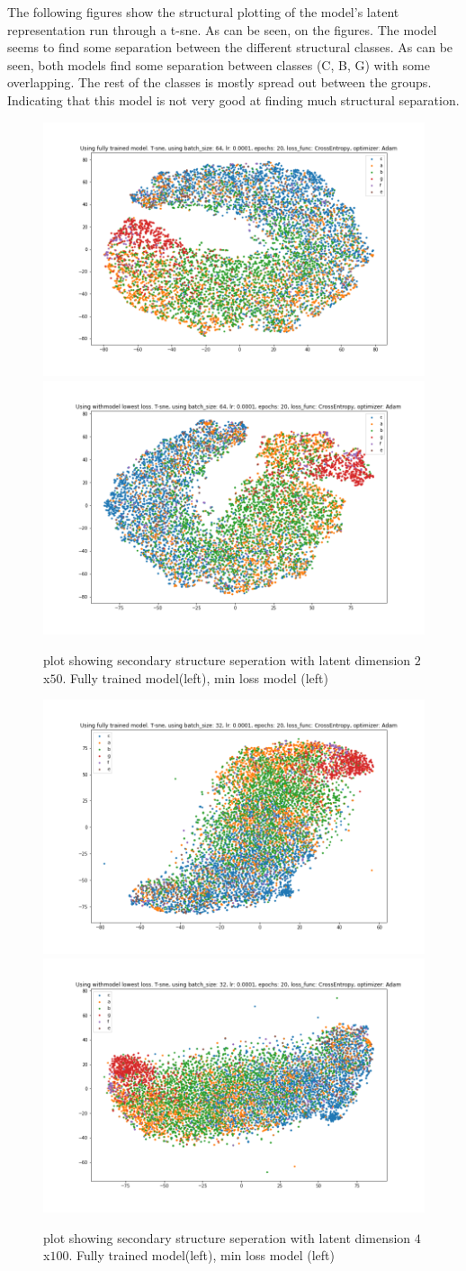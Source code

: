 \noindent
The following figures show the structural plotting of the model's latent representation run through a t-sne. As can be seen, on the figures. The model seems to find some separation between the different structural classes. As can be seen, both models find some separation between classes (C, B, G) with some overlapping. The rest of the classes is mostly spread out between the groups. Indicating that this model is not very good at finding much structural separation. \\

\begin{figure}[!ht]
  \centering
  \includegraphics[width=0.4\linewidth]{latex/imgs/last_50.png}
  \includegraphics[width=0.4\linewidth]{latex/imgs/best_50.png}
  \caption{plot showing secondary structure seperation with latent dimension $2$x$50$. Fully trained model(left), min loss model (left)}
\end{figure}

\begin{figure}[!ht]
  \centering
  \includegraphics[width=0.4\linewidth]{latex/imgs/last_100.png}
  \includegraphics[width=0.4\linewidth]{latex/imgs/best_100.png}
  \caption{plot showing secondary structure seperation with latent dimension $4$x$100$. Fully trained model(left), min loss model (left)}
\end{figure}

